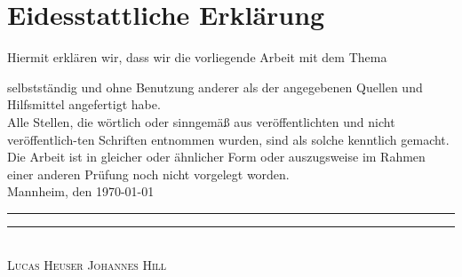 \chapter*{Eidesstattliche Erklärung}

Hiermit erklären wir, dass wir die vorliegende Arbeit mit dem Thema
\begin{quote}
\textit{\titel}%
\end{quote}
selbstständig und ohne Benutzung anderer als der angegebenen Quellen und Hilfsmittel angefertigt habe. \\[2ex]
Alle Stellen, die wörtlich oder sinngemäß aus veröffentlichten und nicht veröffentlich-ten Schriften entnommen wurden, sind als solche kenntlich gemacht. \\[2ex]
Die Arbeit ist in gleicher oder ähnlicher Form oder auszugsweise im Rahmen einer anderen Prüfung noch nicht vorgelegt worden.
\\[10ex]


Mannheim, den \today \\[4ex]


\rule[-0.2cm]{5cm}{0.5pt} \hspace{4cm} \rule[-0.2cm]{5cm}{0.5pt} \\

\textsc{Lucas Heuser} \hspace{6,6cm} \textsc{Johannes Hill}

